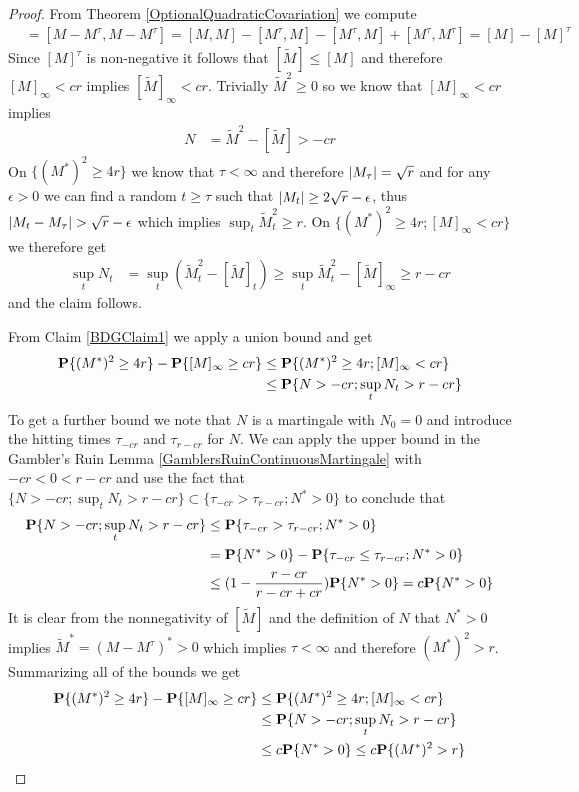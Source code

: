 \begin{proof}
From Theorem \ref{OptionalQuadraticCovariation} we compute
\begin{align*}
[\tilde{M}] &= [M - M^\tau, M - M^\tau] = [M,M] -  [M^\tau, M] - [M^\tau, M] + [M^\tau, M^\tau] = [M] - [M]^\tau
\end{align*} 
Since $[M]^\tau$ is non-negative it follows that $[\tilde{M}] \leq [M]$ and therefore $[M]_\infty < cr$ implies $[\tilde{M}]_\infty < cr$.  Trivially $\tilde{M}^2 \geq 0$ so we know that $[M]_\infty < cr$ implies 
\begin{align*}
N &= \tilde{M}^2 - [\tilde{M}] > -cr
\end{align*}  
On $\lbrace (M^*)^2 \geq 4r \rbrace$ we know that $\tau < \infty$ and therefore $\left \vert M_\tau \right \vert = \sqrt{r}$ and for any $\epsilon > 0$ we can find a random $t \geq \tau$ such that $\left \vert M_t \right \vert \geq 2\sqrt{r} - \epsilon$, thus $\left \vert M_t - M_\tau \right \vert > \sqrt{r} - \epsilon$ which implies $\sup_t \tilde{M}^2_t \geq r$.  On $\lbrace (M^*)^2 \geq 4r ; [M]_\infty < cr \rbrace$ we therefore get 
\begin{align*}
\sup_t N_t &= \sup_t (\tilde{M}_t^2 - [\tilde{M}]_t) \geq \sup_t \tilde{M}_t^2 -  [\tilde{M}]_\infty \geq r - cr
\end{align*}
and the claim follows.

From Claim \ref{BDGClaim1} we apply a union bound and get
\begin{align*}
\textbf{P}\{(M^*)^2 \geq 4r\} - \textbf{P}\{[M]_\infty \geq cr\} &\leq \textbf{P}\{(M^*)^2 \geq 4r; [M]_\infty < cr\} \\
&\leq \textbf{P}\{N > -cr; \sup_t N_t > r - cr\}
\end{align*}
To get a further bound we note that $N$ is a martingale with $N_0 = 0$ and introduce the hitting times $\tau_{-cr}$ and $\tau_{r-cr}$ for $N$.  We can apply the upper bound in the Gambler's Ruin Lemma \ref{GamblersRuinContinuousMartingale} with $-cr < 0 < r - cr$ and use the fact that $\lbrace N > -cr; \sup_t N_t > r - cr \rbrace \subset \lbrace \tau_{-cr} > \tau_{r - cr} ; N^* > 0 \rbrace$ to conclude that 
\begin{align*}
\textbf{P}\{N > -cr; \sup_t N_t > r - cr\} &\leq \textbf{P}\{\tau_{-cr} > \tau_{r - cr} ; N^* > 0\} \\
&= \textbf{P}\{N^* > 0\} - \textbf{P}\{\tau_{-cr} \leq \tau_{r - cr} ; N^* > 0\} \\
&\leq (1 - \frac{r - cr}{r -cr + cr})\textbf{P}\{N^* > 0\} = c \textbf{P}\{N^* > 0\}
\end{align*}
It is clear from the nonnegativity of $[\tilde{M}]$ and the definition of $N$ that $N^* > 0$ implies $\tilde{M}^*= (M-M^\tau)^* > 0$ which implies $\tau < \infty$ and therefore $(M^*)^2 > r$.  Summarizing 
all of the bounds we get
\begin{align*}
\textbf{P}\{(M^*)^2 \geq 4r\} - \textbf{P}\{[M]_\infty \geq cr\} &\leq \textbf{P}\{(M^*)^2 \geq 4r; [M]_\infty < cr\} \\
&\leq \textbf{P}\{N > -cr; \sup_t N_t > r - cr\} \\
&\leq c \textbf{P}\{N^* > 0\} \leq c \textbf{P}\{(M^*)^2 > r\}
\end{align*}


\end{proof}
